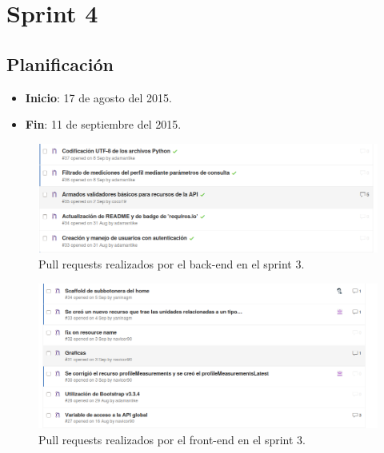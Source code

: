\section{Sprint 4}%

\subsection{Planificación}
\begin{itemize}
    \item \textbf{Inicio}: 17 de agosto del 2015.
    \item \textbf{Fin}: 11 de septiembre del 2015.
\end{itemize}

\begin{figure}[h!]
  \centering
  \includegraphics[width=.8\textwidth]{img/4-PR_back}
  \caption{Pull requests realizados por el back-end en el sprint 3.}
  \label{4-PR_back}
\end{figure}
\begin{figure}[h!]
  \centering
  \includegraphics[width=.8\textwidth]{img/4-PR_front}
  \caption{Pull requests realizados por el front-end en el sprint 3.}
  \label{4-PR_front}
\end{figure}

